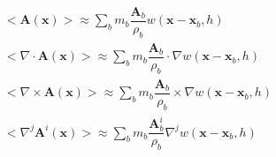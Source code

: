\begin{align}
<\textbf{A}\left(\textbf{x}\right)> \approx \sum_b m_b \dfrac{\textbf{A}_b}{\rho_b} w\left(\textbf{x}-\textbf{x}_b, h\right) \\
<\nabla \cdot \textbf{A}\left(\textbf{x}\right)> \approx \sum_b m_b \dfrac{\textbf{A}_b}{\rho_b} \cdot \nabla w\left(\textbf{x} - \textbf{x}_b, h\right) \\
<\nabla \times \textbf{A}\left(\textbf{x}\right)> \approx \sum_b m_b \dfrac{\textbf{A}_b}{\rho_b} \times \nabla w\left(\textbf{x} - \textbf{x}_b, h\right) \\
<\nabla^j \textbf{A}^i\left(\textbf{x}\right)> \approx \sum_b m_b \dfrac{\textbf{A}_b^i}{\rho_b} \nabla^j w\left(\textbf{x} - \textbf{x}_b, h\right) 
\label{eq:SPH-vecctor-function}
\end{align}

